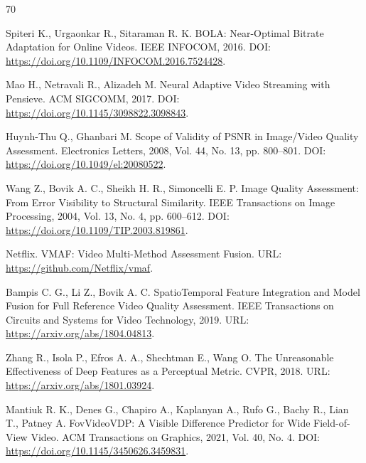 \documentclass[12pt,a4paper,oneside,openany]{report}
\begin{document}

\begin{thebibliography}{70}


Spiteri K., Urgaonkar R., Sitaraman R. K.
BOLA: Near-Optimal Bitrate Adaptation for Online Videos.
IEEE INFOCOM, 2016.
DOI: \url{https://doi.org/10.1109/INFOCOM.2016.7524428}.

Mao H., Netravali R., Alizadeh M.
Neural Adaptive Video Streaming with Pensieve.
ACM SIGCOMM, 2017.
DOI: \url{https://doi.org/10.1145/3098822.3098843}.


Huynh-Thu Q., Ghanbari M.
Scope of Validity of PSNR in Image/Video Quality Assessment.
Electronics Letters, 2008, Vol. 44, No. 13, pp. 800--801.
DOI: \url{https://doi.org/10.1049/el:20080522}.

Wang Z., Bovik A. C., Sheikh H. R., Simoncelli E. P.
Image Quality Assessment: From Error Visibility to Structural Similarity.
IEEE Transactions on Image Processing, 2004, Vol. 13, No. 4, pp. 600--612.
DOI: \url{https://doi.org/10.1109/TIP.2003.819861}.

Netflix.
VMAF: Video Multi-Method Assessment Fusion.
URL: \url{https://github.com/Netflix/vmaf}.

Bampis C. G., Li Z., Bovik A. C.
SpatioTemporal Feature Integration and Model Fusion for Full Reference Video Quality Assessment.
IEEE Transactions on Circuits and Systems for Video Technology, 2019.
URL: \url{https://arxiv.org/abs/1804.04813}.

Zhang R., Isola P., Efros A. A., Shechtman E., Wang O.
The Unreasonable Effectiveness of Deep Features as a Perceptual Metric.
CVPR, 2018.
URL: \url{https://arxiv.org/abs/1801.03924}.

Mantiuk R. K., Denes G., Chapiro A., Kaplanyan A., Rufo G., Bachy R., Lian T., Patney A.
FovVideoVDP: A Visible Difference Predictor for Wide Field-of-View Video.
ACM Transactions on Graphics, 2021, Vol. 40, No. 4.
DOI: \url{https://doi.org/10.1145/3450626.3459831}.


\end{thebibliography}
\end{document}
